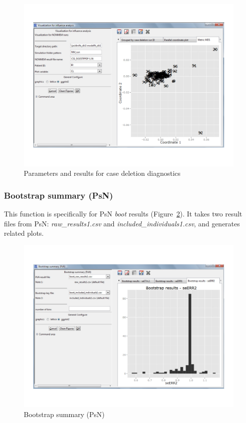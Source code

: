 \documentclass[a4paper]{article}
\begin{document}
\begin{figure}[h!tb] \centering
\includegraphics[scale=0.6]{infCddPara.pdf}
\caption{Parameters and results for case deletion diagnostics}
\label{infCddPara}
\end{figure}
\subsubsection{Bootstrap summary (PsN)}
This function is specifically for PsN \textit{boot} results (Figure~\ref{bootPsN}). It takes two result files from PsN: \textit{raw\_results1.csv} and \textit{included\_individuals1.csv}, and generates related plots.
\begin{figure}[h!tb] \centering
\includegraphics[scale=0.6]{bootPsN.pdf}
\caption{Bootstrap summary (PsN)}
\label{bootPsN}
\end{figure}
\end{document}
